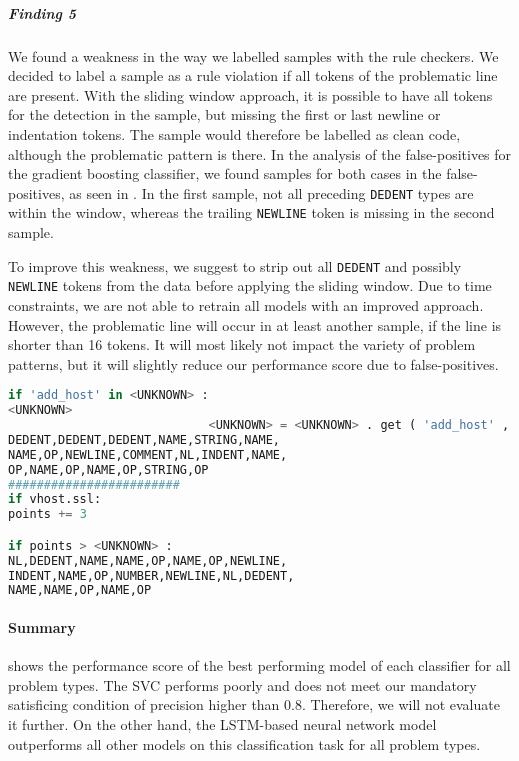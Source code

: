 \subparagraph{Finding 5}
We found a weakness in the way we labelled samples with the rule checkers. We decided to label a sample as a rule violation if all tokens of the problematic line are present. With the sliding window approach, it is possible to have all tokens for the detection in the sample, but missing the first or last newline or indentation tokens. The sample would therefore be labelled as clean code, although the problematic pattern is there. In the analysis of the false-positives for the gradient boosting classifier, we found samples for both cases in the false-positives, as seen in . In the first sample, not all preceding \texttt{DEDENT} types are within the window, whereas the trailing \texttt{NEWLINE} token is missing in the second sample.

To improve this weakness, we suggest to strip out all \texttt{DEDENT} and possibly \texttt{NEWLINE} tokens from the data before applying the sliding window. Due to time constraints, we are not able to retrain all models with an improved approach. However, the problematic line will occur in at least another sample, if the line is shorter than 16 tokens. It will most likely not impact the variety of problem patterns, but it will slightly reduce our performance score due to false-positives.


\begin{lstlisting}[float=h, language=Python, label=lst:weaknes_end_start_sliding_window, caption={False-positive samples of the best \high{gradient boosting classifier} with 300 boosting stages, a learning rate of 0.2, type encoding and without resampling for the CCS type. In the first sample, not all preceding \texttt{DEDENT} tokens are in this window. For the second example, the trailing \texttt{NEWLINE} token is missing in the window. Without this encoding issue, both samples would have been most likely detected correctly.}]
if 'add_host' in <UNKNOWN> : 
<UNKNOWN> 
                            <UNKNOWN> = <UNKNOWN> . get ( 'add_host' ,
DEDENT,DEDENT,DEDENT,NAME,STRING,NAME,
NAME,OP,NEWLINE,COMMENT,NL,INDENT,NAME,
OP,NAME,OP,NAME,OP,STRING,OP
########################
if vhost.ssl: 
points += 3 

if points > <UNKNOWN> :
NL,DEDENT,NAME,NAME,OP,NAME,OP,NEWLINE,
INDENT,NAME,OP,NUMBER,NEWLINE,NL,DEDENT,
NAME,NAME,OP,NAME,OP
\end{lstlisting}


\paragraph{Summary}

  shows the performance score of the best performing model of each classifier for all problem types.
 The SVC performs poorly and does not meet our mandatory satisficing condition of precision higher than 0.8. Therefore, we will not evaluate it further. On the other hand, the LSTM-based neural network model outperforms all other models on this classification task for all problem types.

